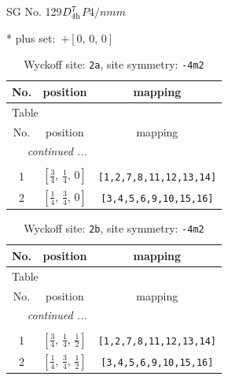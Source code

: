 \documentclass[fleqn,8pt]{jsarticle}
\begin{document}
\setcounter{MaxMatrixCols}{32}

\renewcommand{\tablename}{Table~}
\renewcommand{\figurename}{Figure~}
\begin{center}
\LARGE
SG No. 129\quad$D_{\rm 4h}^{7}$\quad$P4/nmm$\quad[ tetragonal ]
\end{center}
* plus set:\,\,\,$+\left[ 0,\, 0,\, 0 \right]$
\renewcommand{\arraystretch}{1.2}
\begin{longtable}{ccc}
\caption{Wyckoff site: {\tt 2a}, site symmetry: {\tt -4m2}}
 \\
 \hline \hline
No. & position & mapping \\ \hline \endfirsthead

\multicolumn{2}{l}{\tablename\ \thetable{}} \\
 \hline \hline
No. & position & mapping \\ \hline \endhead

 \hline \hline
\multicolumn{2}{r}{\footnotesize\it continued ...} \\ \endfoot

 \hline \hline
\multicolumn{2}{r}{} \\ \endlastfoot

1 & $\left[ \frac{3}{4},\, \frac{1}{4},\, 0 \right]$ & {\tt [1,2,7,8,11,12,13,14]} \\ \hline
2 & $\left[ \frac{1}{4},\, \frac{3}{4},\, 0 \right]$ & {\tt [3,4,5,6,9,10,15,16]} \\
\end{longtable}
\renewcommand{\arraystretch}{1.2}
\begin{longtable}{ccc}
\caption{Wyckoff site: {\tt 2b}, site symmetry: {\tt -4m2}}
 \\
 \hline \hline
No. & position & mapping \\ \hline \endfirsthead

\multicolumn{2}{l}{\tablename\ \thetable{}} \\
 \hline \hline
No. & position & mapping \\ \hline \endhead

 \hline \hline
\multicolumn{2}{r}{\footnotesize\it continued ...} \\ \endfoot

 \hline \hline
\multicolumn{2}{r}{} \\ \endlastfoot

1 & $\left[ \frac{3}{4},\, \frac{1}{4},\, \frac{1}{2} \right]$ & {\tt [1,2,7,8,11,12,13,14]} \\ \hline
2 & $\left[ \frac{1}{4},\, \frac{3}{4},\, \frac{1}{2} \right]$ & {\tt [3,4,5,6,9,10,15,16]} \\
\end{longtable}
\end{document}
